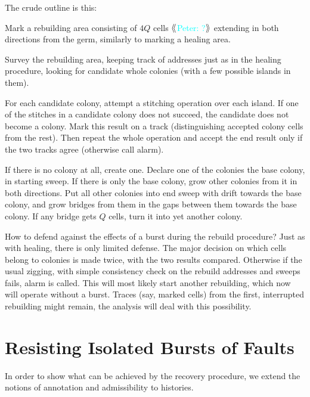 \documentclass[12pt]{memoir}
\newcommand{\authnote}[3]
{{ \textcolor{#3}{\( \langle\hspace{-0.2em}\langle \)\textsf{\footnotesize #1: #2}\( \rangle\hspace{-0.2em}\rangle \)}}}
\newcommand{\authnote}[2]{}
\newcommand{\Pnote}[1]{{\authnote{Peter}{#1}{cyan}}}
\begin{document}
The crude outline is this:
\begin{bullets}
 \item Mark a rebuilding area consisting of \( 4Q \) cells \Pnote{?}
   extending in both directions from the germ, similarly to marking a healing area.

 \item Survey the rebuilding area, keeping track of addresses just as in the healing procedure,
  looking for candidate whole colonies (with a few possible islands in them).

 \item For each candidate colony, attempt a stitching operation over each island.
 If one of the stitches in a candidate colony does not succeed,
 the candidate does not become a colony.
 Mark this result on a track (distinguishing accepted colony cells from the rest).
 Then repeat the whole operation and accept the end result only if the two tracks agree
 (otherwise call alarm).
 
\item If there is no colony at all, create one.
  Declare one of the colonies the base colony, in starting sweep.
  If there is only the base colony, grow other colonies from it in both directions.
  Put all other colonies into end sweep with drift towards the base colony, and
  grow bridges from them in the gaps between them towards the base colony.
  If any bridge gets \( Q \) cells, turn it into yet another colony.

\end{bullets}

How to defend against the effects of a burst during the rebuild procedure?
Just as with healing, there is only limited defense.
The major decision on which cells belong to colonies is made twice, with the
two results compared.
Otherwise if the usual zigging, with simple consistency check on the rebuild addresses
and sweeps fails, alarm is called.
This will most likely start another rebuilding, which now will operate without a burst.
Traces (say, marked cells) from the first, interrupted rebuilding might remain,
the analysis will deal with this possibility.




\section{Resisting Isolated Bursts of Faults}
\label{sec:1-level-noise}

In order to show what can be achieved by the recovery procedure,
we extend the notions of annotation and admissibility to histories.
\end{document}
